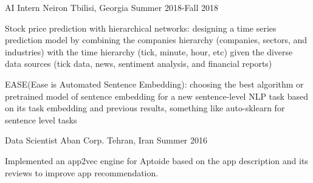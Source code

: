 

\begin{cventries}

 \cventry
    {AI Intern} %
    {Neiron} %
    {Tbilisi, Georgia} %
    {Summer 2018-Fall 2018} %
    {
      \begin{cvitems} %
        \item {Stock price prediction with hierarchical networks: designing a time series prediction model by combining  the companies hierarchy (companies, sectors, and industries) with the time hierarchy (tick, minute, hour, etc) given the diverse data sources (tick data, news, sentiment analysis, and financial reports)}
        \item {EASE(Ease is Automated Sentence Embedding): choosing the best algorithm or pretrained model of sentence embedding for a new sentence-level NLP task based on its task embedding and previous results, something like auto-sklearn for sentence level tasks}
      \end{cvitems}
    }



  \cventry
    {Data Scientist} %
    {Aban Corp.} %
    {Tehran, Iran} %
    {Summer 2016} %
    {
      \begin{cvitems} %
        \item {Implemented an app2vec engine for Aptoide based on the app description and its reviews to improve app recommendation.}
      \end{cvitems}
    }


\end{cventries}
